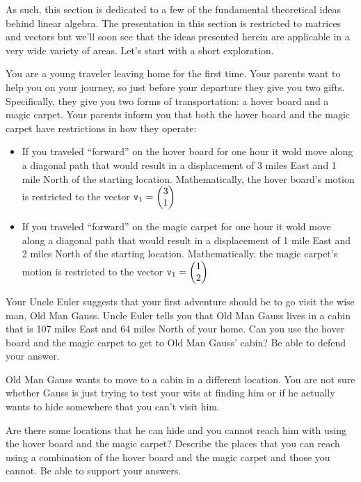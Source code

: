 As such, this section is dedicated to a few of the fundamental theoretical ideas behind
linear algebra.  The presentation in this section is restricted to matrices and vectors
but we'll soon see that the ideas presented herein are applicable in a very wide variety
of areas.  Let's start with a short exploration.


\begin{problem}
    You are a young traveler leaving home for the first time.  Your parents want to help
    you on your journey, so just before your departure they give you two gifts.
    Specifically, they give you two forms of transportation: a hover board and a magic
    carpet.  Your parents inform you that both the hover board and the magic carpet have
    restrictions in how they operate:
    \begin{itemize}
        \item If you traveled ``forward'' on the hover board for one hour it wold move along a
            diagonal path that would result in a displacement of 3 miles East and 1 mile
            North of the starting location.  Mathematically, the hover board's motion is
            restricted to the vector $\texttt{v}_1 = \begin{pmatrix} 3\\1\end{pmatrix}$
        \item If you traveled ``forward'' on the magic carpet for one hour it wold move along a
            diagonal path that would result in a displacement of 1 mile East and 2 miles
            North of the starting location.  Mathematically, the magic carpet's motion is
            restricted to the vector $\texttt{v}_1 = \begin{pmatrix} 1\\2\end{pmatrix}$
    \end{itemize}
    Your Uncle Euler suggests that your first adventure should be to go visit the wise
    man, Old Man Gauss.  Uncle Euler tells you that Old Man Gauss lives in a cabin that is
    107 miles East and 64 miles North of your home.  Can you use the hover board and the
    magic carpet to get to Old Man Gauss' cabin?  Be able to defend your answer.
\end{problem}

\begin{problem}
    Old Man Gauss wants to move to a cabin in a different location.  You are not sure
    whether Gauss is just trying to test your wits at finding him or if he actually wants
    to hide somewhere that you can't visit him.  

    Are there some locations that he can hide and you cannot reach him with using the
    hover board and the magic carpet?  Describe the places that you can reach using a
    combination of the hover board and the magic carpet and those you cannot.  Be able to
    support your answers.
\end{problem}


